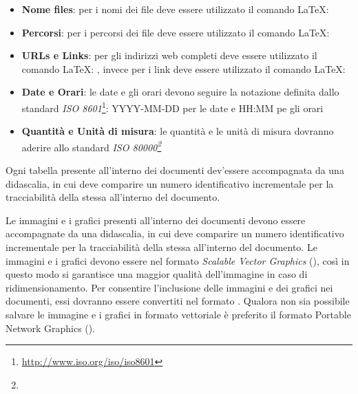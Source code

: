\documentclass[12pt,a4paper]{article}
\begin{document}
\begin{itemize}
  \item \textbf{Nome files}: per i nomi dei file deve essere utilizzato il comando \LaTeX: 
  \item  \textbf{Percorsi}: per i percorsi dei file deve essere utilizzato il comando \LaTeX: 
  \item \textbf{URLs e Links}:  per gli indirizzi web completi deve essere utilizzato il comando \LaTeX: , invece per i link deve essere utilizzato il comando \LaTeX: 
  \item \textbf{Date e Orari}: le date e gli orari devono seguire la notazione definita dallo standard \emph{ISO 8601}\footnote{\url{http://www.iso.org/iso/iso8601}}: YYYY-MM-DD per le date e HH:MM pe gli orari
  \item \textbf{Quantità e Unità di misura}: le quantità e le unità di misura dovranno aderire allo standard \emph{ISO 80000\footnote{}}
\end{itemize}

Ogni tabella presente all’interno dei documenti dev’essere accompagnata da una didascalia, in cui deve comparire un numero identificativo incrementale per la tracciabilità della stessa all’interno del documento.

Le immagini e i grafici presenti all’interno dei documenti devono essere accompagnate da una didascalia, in cui deve comparire un numero identificativo incrementale per la tracciabilità della stessa all’interno del documento. Le immagini e i grafici devono essere nel formato \emph{Scalable Vector Graphics} (), così in questo modo si garantisce una maggior qualità dell’immagine in caso di ridimensionamento. Per consentire l’inclusione delle immagini e dei grafici nei documenti, essi dovranno essere convertiti nel formato  . Qualora non sia possibile salvare le immagine e i grafici in formato vettoriale è preferito il formato Portable Network Graphics ().
\end{document}
